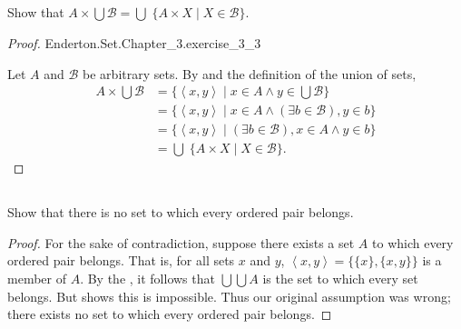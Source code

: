 \documentclass{report}
\newcommand{\pair}[1]{\left< #1 \right>}
\begin{document}
\subsection{}%

Show that $A \times \bigcup \mathscr{B} =
  \bigcup\;\{ A \times X \mid X \in \mathscr{B} \}$.

\begin{proof}

    {Enderton.Set.Chapter\_3.exercise\_3\_3}

  Let $A$ and $\mathscr{B}$ be arbitrary sets.
  By  and the definition of the union of sets,
  \begin{align*}
    A \times \bigcup\mathscr{B}
      & = \{ \pair{x, y} \mid
        x \in A \land y \in \bigcup\mathscr{B} \} \\
      & = \{ \pair{x, y} \mid
        x \in A \land (\exists b \in \mathscr{B}), y \in b \} \\
      & = \{ \pair{x, y} \mid
        (\exists b \in \mathscr{B}), x \in A \land y \in b \} \\
      & = \bigcup\; \{ A \times X \mid X \in \mathscr{B} \}.
  \end{align*}

\end{proof}

\subsection{}%

Show that there is no set to which every ordered pair belongs.

\begin{proof}

  For the sake of contradiction, suppose there exists a set $A$ to which every
    ordered pair belongs.
  That is, for all sets $x$ and $y$, $\pair{x, y} = \{\{x\}, \{x, y\}\}$
    is a member of $A$.
  By the , it follows that $\bigcup\bigcup A$ is the
    set to which every set belongs.
  But  shows this is impossible.
  Thus our original assumption was wrong; there exists no set to which every
    ordered pair belongs.

\end{proof}

\subsection{}%
\end{document}
